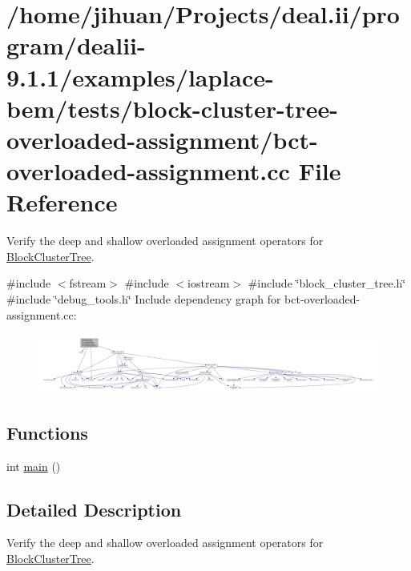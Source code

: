 \hypertarget{bct-overloaded-assignment_8cc}{}\section{/home/jihuan/\+Projects/deal.ii/program/dealii-\/9.1.1/examples/laplace-\/bem/tests/block-\/cluster-\/tree-\/overloaded-\/assignment/bct-\/overloaded-\/assignment.cc File Reference}
\label{bct-overloaded-assignment_8cc}


Verify the deep and shallow overloaded assignment operators for {\ttfamily \hyperlink{classBlockClusterTree}{Block\+Cluster\+Tree}}.  


{\ttfamily \#include $<$fstream$>$}\newline
{\ttfamily \#include $<$iostream$>$}\newline
{\ttfamily \#include \char`\"{}block\+\_\+cluster\+\_\+tree.\+h\char`\"{}}\newline
{\ttfamily \#include \char`\"{}debug\+\_\+tools.\+h\char`\"{}}\newline
Include dependency graph for bct-\/overloaded-\/assignment.cc\+:
\nopagebreak
\begin{figure}[H]
\begin{center}
\leavevmode
\includegraphics[width=350pt]{bct-overloaded-assignment_8cc__incl}
\end{center}
\end{figure}
\subsection*{Functions}
\begin{DoxyCompactItemize}
\item 
int \hyperlink{bct-overloaded-assignment_8cc_ae66f6b31b5ad750f1fe042a706a4e3d4}{main} ()
\end{DoxyCompactItemize}


\subsection{Detailed Description}
Verify the deep and shallow overloaded assignment operators for {\ttfamily \hyperlink{classBlockClusterTree}{Block\+Cluster\+Tree}}. 


